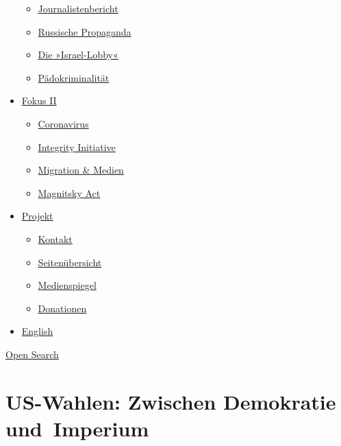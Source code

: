 \begin{itemize}
  \begin{itemize}
  \tightlist
  \item
    \href{https://swprs.org/bericht-eines-journalisten/}{Journalistenbericht}
  \item
    \href{https://swprs.org/russische-propaganda/}{Russische Propaganda}
  \item
    \href{https://swprs.org/die-israel-lobby-fakten-und-mythen/}{Die
    »Israel-Lobby«}
  \item
    \href{https://swprs.org/geopolitik-und-paedokriminalitaet/}{Pädokriminalität}
  \end{itemize}
\item
  \href{https://swprs.org/migration-und-medien/}{Fokus II}

  \begin{itemize}
  \tightlist
  \item
    \href{https://swprs.org/covid-19-hinweis-ii/}{Coronavirus}
  \item
    \href{https://swprs.org/die-integrity-initiative/}{Integrity
    Initiative}
  \item
    \href{https://swprs.org/migration-und-medien/}{Migration \& Medien}
  \item
    \href{https://swprs.org/der-fall-magnitsky/}{Magnitsky Act}
  \end{itemize}
\item
  \href{https://swprs.org/kontakt/}{Projekt}

  \begin{itemize}
  \tightlist
  \item
    \href{https://swprs.org/kontakt/}{Kontakt}
  \item
    \href{https://swprs.org/uebersicht/}{Seitenübersicht}
  \item
    \href{https://swprs.org/medienspiegel/}{Medienspiegel}
  \item
    \href{https://swprs.org/donationen/}{Donationen}
  \end{itemize}
\item
  \href{https://swprs.org/contact/}{English}
\end{itemize}

\protect\hyperlink{}{Open Search}

\hypertarget{us-wahlen-zwischen-demokratie-und-imperium}{%
\section{US-Wahlen: Zwischen Demokratie
und~Imperium}\label{us-wahlen-zwischen-demokratie-und-imperium}}

